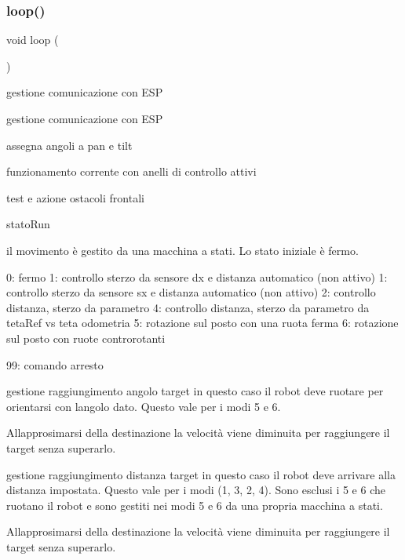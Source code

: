 \subsubsection{\texorpdfstring{loop()}{loop()}}
{\footnotesize\ttfamily void loop (\begin{DoxyParamCaption}{ }\end{DoxyParamCaption})}

gestione comunicazione con E\+SP

gestione comunicazione con E\+SP

assegna angoli a pan e tilt

funzionamento corrente con anelli di controllo attivi

test e azione ostacoli frontali

stato\+Run

il movimento è gestito da una macchina a stati. Lo stato iniziale è fermo.

0\+: fermo 1\+: controllo sterzo da sensore dx e distanza automatico (non attivo) 1\+: controllo sterzo da sensore sx e distanza automatico (non attivo) 2\+: controllo distanza, sterzo da parametro 4\+: controllo distanza, sterzo da parametro da teta\+Ref vs teta odometria 5\+: rotazione sul posto con una ruota ferma 6\+: rotazione sul posto con ruote controrotanti

99\+: comando arresto

gestione raggiungimento angolo target in questo caso il robot deve ruotare per orientarsi con l\textquotesingle{}angolo dato. Questo vale per i modi 5 e 6.

All\textquotesingle{}approsimarsi della destinazione la velocità viene diminuita per raggiungere il target senza superarlo. ~\newline
~\newline
~\newline
~\newline


gestione raggiungimento distanza target in questo caso il robot deve arrivare alla distanza impostata. Questo vale per i modi (1, 3, 2, 4). Sono esclusi i 5 e 6 che ruotano il robot e sono gestiti nei modi 5 e 6 da una propria macchina a stati.

All\textquotesingle{}approsimarsi della destinazione la velocità viene diminuita per raggiungere il target senza superarlo. ~\newline
~\newline
~\newline


